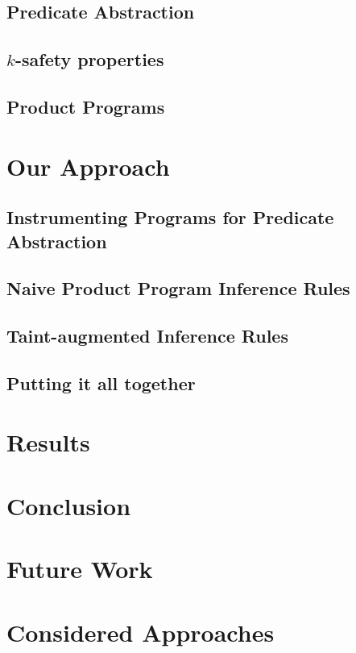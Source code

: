 \documentclass[letterpaper,twocolumn,10pt]{article}
\begin{document}
\subsection{Predicate Abstraction}

\subsection{$k$-safety properties}

\subsection{Product Programs}

\section{Our Approach}

\subsection{Instrumenting Programs for Predicate Abstraction}

\subsection{Naive Product Program Inference Rules}

\subsection{Taint-augmented Inference Rules}

\subsection{Putting it all together}

\section{Results}

\section{Conclusion}

\section{Future Work}

\section{Considered Approaches}
\end{document}
